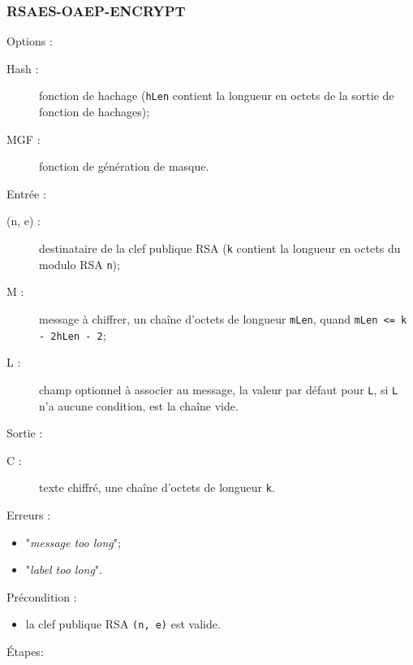 \subsubsection{RSAES-OAEP-ENCRYPT}
Options :
\begin{description}
	\item [Hash :] fonction de hachage (\texttt{hLen} contient la longueur en octets de la sortie de fonction de hachages);
	\item [MGF :] fonction de génération de masque.\\
\end{description} 
Entrée :
\begin{description}
	\item [(n, e) : ] destinataire de la clef publique RSA (\texttt{k} contient la longueur en octets du modulo RSA \texttt{n});
	\item [M : ] message à chiffrer, un chaîne d'octets de longueur \texttt{mLen}, quand \texttt{mLen <= k - 2hLen - 2};
	\item [L : ] champ optionnel à associer au message, la valeur par défaut pour \texttt{L}, si \texttt{L} n'a aucune condition, est la chaîne vide.\\
\end{description}
Sortie :
\begin{description}
	\item [C : ] texte chiffré, une chaîne d'octets de longueur \texttt{k}.\\
\end{description}
Erreurs :  
\begin{itemize}
	\item "\textit{message too long}"; 
	\item "\textit{label too long}".\\
\end{itemize}
Précondition : 
\begin{itemize}
	\item la clef publique RSA \texttt{(n, e)} est valide.\\
\end{itemize}
Étapes:
